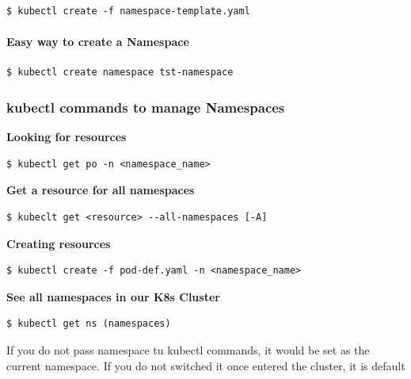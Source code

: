 \documentclass{article}
\newenvironment{blocktemplateIII}[1]{%
    \tcolorbox[beamer,%
    noparskip,breakable,
    ,colframe=Red,%
    colbacklower=LimeGreen!75!LightGreen,%
    title=#1]}%
    {\endtcolorbox}
\newenvironment{codetemplate}[1][]{%
  \mybasecolorbox[#1]
  \itshape
}{%
  \endmybasecolorbox
}
\begin{document}
\begin{codetemplate}{}
\begin{verbatim}
$ kubectl create -f namespace-template.yaml
\end{verbatim}
\end{codetemplate}

\paragraph{Easy way to create a Namespace}

\begin{codetemplate}{}
\begin{verbatim}
$ kubectl create namespace tst-namespace
\end{verbatim}
\end{codetemplate}

\subsubsection{kubectl commands to manage Namespaces}

\textbf{Looking for resources}
\begin{codetemplate}{}
\begin{verbatim}
$ kubectl get po -n <namespace_name>
\end{verbatim}
\end{codetemplate}

\textbf{Get a resource for all namespaces}
\begin{codetemplate}{}
\begin{verbatim}
$ kubeclt get <resource> --all-namespaces [-A]
\end{verbatim}
\end{codetemplate}

\textbf{Creating resources}
\begin{codetemplate}{}
\begin{verbatim}
$ kubectl create -f pod-def.yaml -n <namespace_name>
\end{verbatim}
\end{codetemplate}

\textbf{See all namespaces in our K8s Cluster}
\begin{codetemplate}{}
\begin{verbatim}
$ kubectl get ns (namespaces)
\end{verbatim}
\end{codetemplate}

\begin{blocktemplateIII}{WARNING}
If you do not pass namespace tu kubectl commands, it would be set as the current namespace. If you do not switched it once entered the cluster, it is default
\end{blocktemplateIII}
\end{document}
